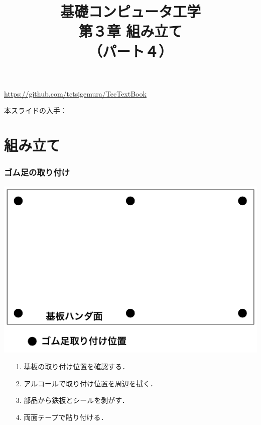 \documentclass{beamer}                 %
\begin{document}
\title{基礎コンピュータ工学\\第３章 組み立て\\（パート４）}
\date{}

\begin{frame}
  \titlepage
  \centerline{\url{https://github.com/tctsigemura/TecTextBook}}
  \vfill
  \centerline{本スライドの入手：
    }
\end{frame}


\section{組み立て}
\begin{frame}
  \frametitle{ゴム足の取り付け}
  \vfill
  \centerline{\includegraphics[scale=0.7]{../Tikz/asi.pdf}}
  \vfill
  \begin{enumerate}
    \item[1.] 基板の取り付け位置を確認する．
    \item[2.] アルコールで取り付け位置を周辺を拭く．
    \item[3.] 部品から鉄板とシールを剥がす．
    \item[4.] 両面テープで貼り付ける．
  \end{enumerate}
  \vfill
\end{frame}
\end{document}
